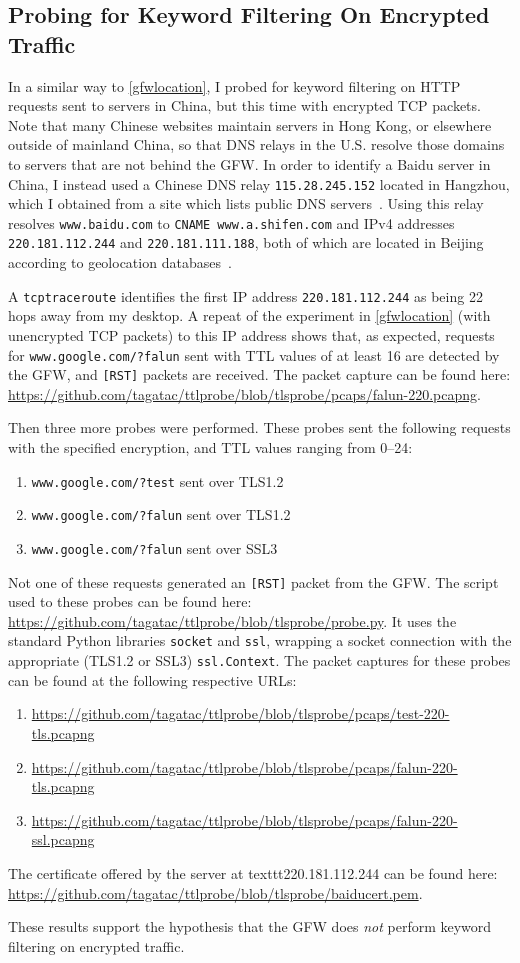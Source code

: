 \subsection{Probing for Keyword Filtering On Encrypted Traffic}
In a similar way to \autoref{gfwlocation}, I probed for keyword filtering on HTTP requests sent to servers in China, but this time with encrypted TCP packets.
Note that many Chinese websites maintain servers in Hong Kong, or elsewhere outside of mainland China, so that DNS relays in the U.S. resolve those domains to servers that are not behind the GFW.
In order to identify a Baidu server in China, I instead used a Chinese DNS relay \texttt{115.28.245.152} located in Hangzhou, which I obtained from a site which lists public DNS servers~\cite{PublicDNS}.
Using this relay resolves \texttt{www.baidu.com} to \texttt{CNAME www.a.shifen.com} and IPv4 addresses \texttt{220.181.112.244} and \texttt{220.181.111.188}, both of which are located in Beijing according to geolocation databases~\cite{IPLookup244,IPLookup188}.

A \texttt{tcptraceroute} identifies the first IP address \texttt{220.181.112.244} as being 22 hops away from my desktop.
A repeat of the experiment in \autoref{gfwlocation} (with unencrypted TCP packets) to this IP address shows that, as expected, requests for \texttt{www.google.com/?falun} sent with TTL values of at least 16 are detected by the GFW, and \texttt{[RST]} packets are received.
The packet capture can be found here: \url{https://github.com/tagatac/ttlprobe/blob/tlsprobe/pcaps/falun-220.pcapng}.

Then three more probes were performed.
These probes sent the following requests with the specified encryption, and TTL values ranging from 0--24:
\begin{enumerate}
	\item \texttt{www.google.com/?test} sent over TLS1.2
	\item \texttt{www.google.com/?falun} sent over TLS1.2
	\item \texttt{www.google.com/?falun} sent over SSL3
\end{enumerate}
Not one of these requests generated an \texttt{[RST]} packet from the GFW.
The script used to these probes can be found here: \url{https://github.com/tagatac/ttlprobe/blob/tlsprobe/probe.py}.
It uses the standard Python libraries \texttt{socket} and \texttt{ssl}, wrapping a socket connection with the appropriate (TLS1.2 or SSL3) \texttt{ssl.Context}.
The packet captures for these probes can be found at the following respective URLs:
\begin{enumerate}
	\item \url{https://github.com/tagatac/ttlprobe/blob/tlsprobe/pcaps/test-220-tls.pcapng}
	\item \url{https://github.com/tagatac/ttlprobe/blob/tlsprobe/pcaps/falun-220-tls.pcapng}
	\item \url{https://github.com/tagatac/ttlprobe/blob/tlsprobe/pcaps/falun-220-ssl.pcapng}
\end{enumerate}
The certificate offered by the server at texttt{220.181.112.244} can be found here: \url{https://github.com/tagatac/ttlprobe/blob/tlsprobe/baiducert.pem}.

These results support the hypothesis that the GFW does \textit{not} perform keyword filtering on encrypted traffic.
